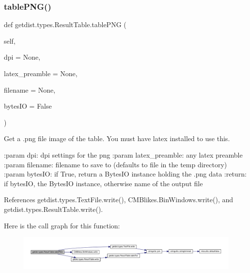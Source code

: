 \subsubsection{\texorpdfstring{table\+P\+N\+G()}{tablePNG()}}
{\footnotesize\ttfamily def getdist.\+types.\+Result\+Table.\+table\+P\+NG (\begin{DoxyParamCaption}\item[{}]{self,  }\item[{}]{dpi = {\ttfamily None},  }\item[{}]{latex\+\_\+preamble = {\ttfamily None},  }\item[{}]{filename = {\ttfamily None},  }\item[{}]{bytes\+IO = {\ttfamily False} }\end{DoxyParamCaption})}

\begin{DoxyVerb}Get a .png file image of the table. You must have latex installed to use this.

:param dpi: dpi settings for the png
:param latex_preamble: any latex preamble
:param filename: filename to save to (defaults to file in the temp directory)
:param bytesIO: if True, return a BytesIO instance holding the .png data
:return: if bytesIO, the BytesIO instance, otherwise name of the output file
\end{DoxyVerb}
 

References getdist.\+types.\+Text\+File.\+write(), C\+M\+Blikes.\+Bin\+Windows.\+write(), and getdist.\+types.\+Result\+Table.\+write().

Here is the call graph for this function\+:
\nopagebreak
\begin{figure}[H]
\begin{center}
\leavevmode
\includegraphics[width=350pt]{classgetdist_1_1types_1_1ResultTable_a515896c352e07b23284d0fca028f4a04_cgraph}
\end{center}
\end{figure}
\mbox{\label{classgetdist_1_1types_1_1ResultTable_a7afab33d231bed5c1ee97b2e9af37c3f}} 
